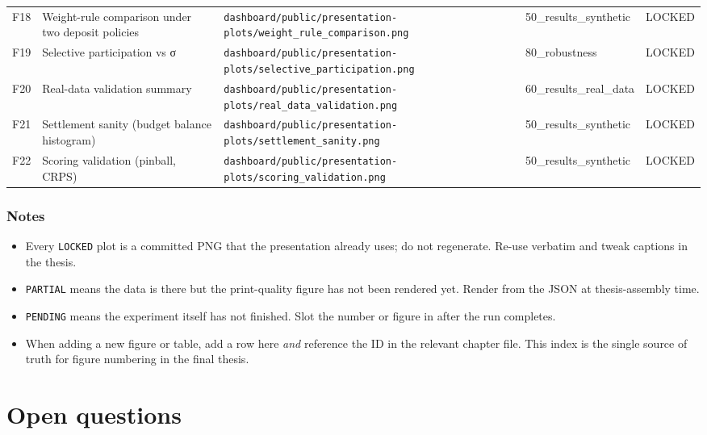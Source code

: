 \documentclass[11pt,a4paper,openany]{report}
\begin{document}
\begin{center}
\begin{tabular}{llllc}
F18 & Weight-rule comparison under two deposit policies & \texttt{dashboard/public/presentation-plots/weight\_rule\_comparison.png} & 50\_results\_synthetic & LOCKED \\
F19 & Selective participation vs σ & \texttt{dashboard/public/presentation-plots/selective\_participation.png} & 80\_robustness & LOCKED \\
F20 & Real-data validation summary & \texttt{dashboard/public/presentation-plots/real\_data\_validation.png} & 60\_results\_real\_data & LOCKED \\
F21 & Settlement sanity (budget balance histogram) & \texttt{dashboard/public/presentation-plots/settlement\_sanity.png} & 50\_results\_synthetic & LOCKED \\
F22 & Scoring validation (pinball, CRPS) & \texttt{dashboard/public/presentation-plots/scoring\_validation.png} & 50\_results\_synthetic & LOCKED \\
\bottomrule
\end{tabular}
\end{center}

\section{Notes}

\begin{itemize}
  \item Every \texttt{LOCKED} plot is a committed PNG that the presentation already
    uses; do not regenerate. Re-use verbatim and tweak captions in the
    thesis.
  \item \texttt{PARTIAL} means the data is there but the print-quality figure has
    not been rendered yet. Render from the JSON at thesis-assembly time.
  \item \texttt{PENDING} means the experiment itself has not finished. Slot the
    number or figure in after the run completes.
  \item When adding a new figure or table, add a row here \emph{and} reference
    the ID in the relevant chapter file. This index is the single
    source of truth for figure numbering in the final thesis.
\end{itemize}

\part*{Open questions}
\end{document}
